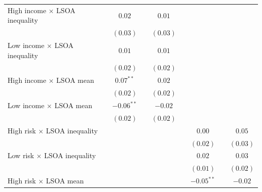 \documentclass[12pt, letter]{scrartcl}
\begin{document}
\begin{tiny}
\begin{longtable}{lcccccccc}
High income $\times$ LSOA inequality        &               & $0.02$        &               & $0.01$        &               &               &               &               \\
                                            &               & $(0.03)$      &               & $(0.03)$      &               &               &               &               \\
Low income $\times$ LSOA inequality         &               & $0.01$        &               & $0.01$        &               &               &               &               \\
                                            &               & $(0.02)$      &               & $(0.02)$      &               &               &               &               \\
High income $\times$ LSOA mean              &               & $0.07^{**}$   &               & $0.02$        &               &               &               &               \\
                                            &               & $(0.02)$      &               & $(0.02)$      &               &               &               &               \\
Low income $\times$ LSOA mean               &               & $-0.06^{**}$  &               & $-0.02$       &               &               &               &               \\
                                            &               & $(0.02)$      &               & $(0.02)$      &               &               &               &               \\
High risk $\times$ LSOA inequality          &               &               &               &               &               & $0.00$        &               & $0.05$        \\
                                            &               &               &               &               &               & $(0.02)$      &               & $(0.03)$      \\
Low risk $\times$ LSOA inequality           &               &               &               &               &               & $0.02$        &               & $0.03$        \\
                                            &               &               &               &               &               & $(0.01)$      &               & $(0.02)$      \\
High risk $\times$ LSOA mean                &               &               &               &               &               & $-0.05^{**}$  &               & $-0.02$       \\

\end{longtable}
\end{tiny}
\end{document}
